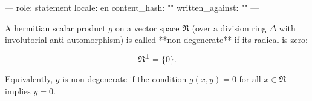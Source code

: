 ---
role: statement
locale: en
content_hash: ""
written_against: ""
---

A hermitian scalar product $g$ on a vector space $\mathfrak{R}$ (over a division ring $\Delta$ with involutorial anti-automorphism) is called **non-degenerate** if its radical is zero:

$$\mathfrak{R}^{\perp} = \{0\}.$$

Equivalently, $g$ is non-degenerate if the condition $g(x, y) = 0$ for all $x \in \mathfrak{R}$ implies $y = 0$.
